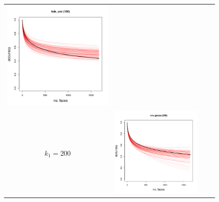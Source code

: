 \documentclass[twoside,11pt]{article}
\newenvironment{myfont}{\fontfamily{phv}\selectfont}{\par}
\begin{document}
\begin{figure}[t]
\begin{tabular}{cccc}
\includegraphics[scale = 0.2, clip = true, trim = 0 0 0 0.6in, valign=c]{repeat_100_kde_ucv.png} \\
\begin{myfont}$k_1 = 200$\end{myfont} &
\includegraphics[scale = 0.2, clip = true, trim = 0 0 0 0.6in, valign=c]{repeat_200_r_cv_gauss.png} &

\end{tabular}
\end{figure}
\end{document}
